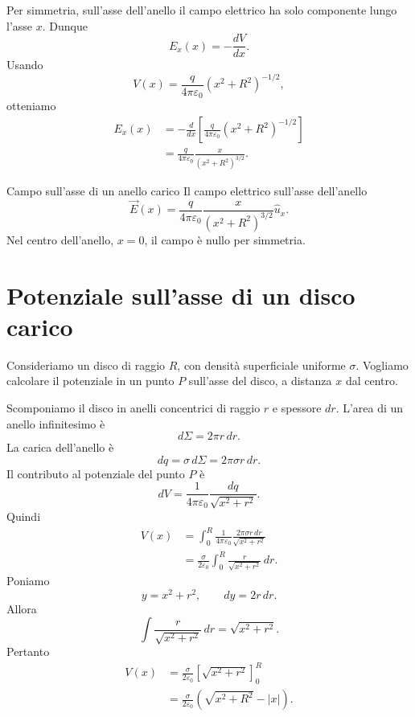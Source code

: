 \documentclass[a4paper]{article}
\begin{document}
Per simmetria, sull'asse dell'anello il campo elettrico ha solo componente lungo l'asse \(x\). Dunque
\[
    E_x(x)=-\frac{dV}{dx}.
\]
Usando
\[
    V(x)=\frac{q}{4\pi\varepsilon_0}(x^2+R^2)^{-1/2},
\]
otteniamo
\begin{align*}
    E_x(x)
    &=-\frac{d}{dx}\left[\frac{q}{4\pi\varepsilon_0}(x^2+R^2)^{-1/2}\right] \\
    &=\frac{q}{4\pi\varepsilon_0}\frac{x}{(x^2+R^2)^{3/2}}.
\end{align*}

\begin{snippetproposition}{Campo sull'asse di un anello carico}
    Il campo elettrico sull'asse dell'anello
    \[
        \vec{E}(x)=\frac{q}{4\pi\varepsilon_0}\frac{x}{(x^2+R^2)^{3/2}}\hat{u}_x.
    \]
    Nel centro dell'anello, \(x=0\), il campo è nullo per simmetria.
\end{snippetproposition}

\section{Potenziale sull'asse di un disco carico}

Consideriamo un disco di raggio \(R\), con densità superficiale uniforme \(\sigma\). Vogliamo calcolare il potenziale in un punto \(P\) sull'asse del disco, a distanza \(x\) dal centro.

\begin{center}
\end{center}

Scomponiamo il disco in anelli concentrici di raggio \(r\) e spessore \(dr\). L'area di un anello infinitesimo è
\[
    d\Sigma=2\pi r\,dr.
\]
La carica dell'anello è
\[
    dq=\sigma\,d\Sigma=2\pi\sigma r\,dr.
\]
Il contributo al potenziale del punto \(P\) è
\[
    dV=\frac{1}{4\pi\varepsilon_0}\frac{dq}{\sqrt{x^2+r^2}}.
\]
Quindi
\begin{align*}
    V(x)
    &=\int_0^R \frac{1}{4\pi\varepsilon_0}\frac{2\pi\sigma r\,dr}{\sqrt{x^2+r^2}} \\
    &=\frac{\sigma}{2\varepsilon_0}\int_0^R \frac{r}{\sqrt{x^2+r^2}}\,dr.
\end{align*}
Poniamo
\[
    y=x^2+r^2,
    \qquad
    dy=2r\,dr.
\]
Allora
\[
    \int \frac{r}{\sqrt{x^2+r^2}}\,dr=\sqrt{x^2+r^2}.
\]
Pertanto
\begin{align*}
    V(x)
    &=\frac{\sigma}{2\varepsilon_0}\left[\sqrt{x^2+r^2}\right]_0^R \\
    &=\frac{\sigma}{2\varepsilon_0}\left(\sqrt{x^2+R^2}-|x|\right).
\end{align*}
\end{document}
